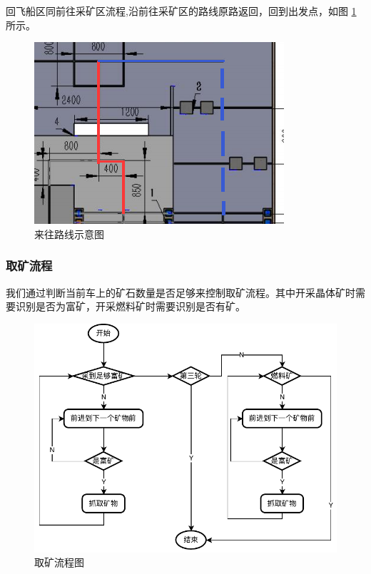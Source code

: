 \documentclass[10pt]{ctexart}
\begin{document}
回飞船区同前往采矿区流程,沿前往采矿区的路线原路返回，回到出发点，如图 \ref{fig:way2} 所示。

\vfill

\begin{figure} %
    \centering
    \includegraphics{algo/way2.png}
    \caption{来往路线示意图}
    \label{fig:way2}
\end{figure}
\vfill

\clearpage

\subsubsection{取矿流程}
我们通过判断当前车上的矿石数量是否足够来控制取矿流程。其中开采晶体矿时需要识别是否为富矿，开采燃料矿时需要识别是否有矿。

\begin{figure}[H]
    \centering
    \includegraphics{algo/mining.pdf}
    \caption{取矿流程图}
    \label{fig:mining}
\end{figure}
\end{document}
